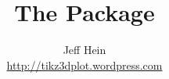 \documentclass[10pt,letterpaper,oneside]{memoir}
\title{The \texttt{\tdplot} Package}
\author{Jeff Hein\\ \url{http://tikz3dplot.wordpress.com}}
\newif\ifscratch		%
\begin{document}
%



\ifscratch
	
\end{document}
